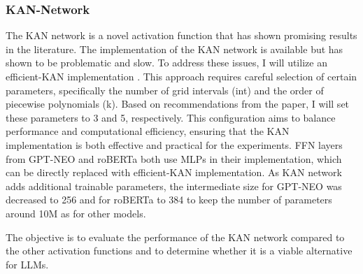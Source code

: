 \subsubsection{KAN-Network}
The KAN network is a novel activation function that has shown promising results in the literature. The implementation of the KAN network is available but has shown to be problematic and slow. To address these issues, I will utilize an efficient-KAN implementation \cite{efficient-kan}. This approach requires careful selection of certain parameters, specifically the number of grid intervals (int) and the order of piecewise polynomials (k). Based on recommendations from the paper, I will set these parameters to 3 and 5, respectively. This configuration aims to balance performance and computational efficiency, ensuring that the KAN implementation is both effective and practical for the experiments. FFN layers from GPT-NEO and roBERTa both use MLPs in their implementation, which can be directly replaced with efficient-KAN implementation. As KAN network adds additional trainable parameters, the intermediate size for GPT-NEO was decreased to 256 and for roBERTa to 384 to keep the number of parameters around 10M as for other models. 


The objective is to evaluate the performance of the KAN network compared to the other activation functions and to determine whether it is a viable alternative for LLMs.